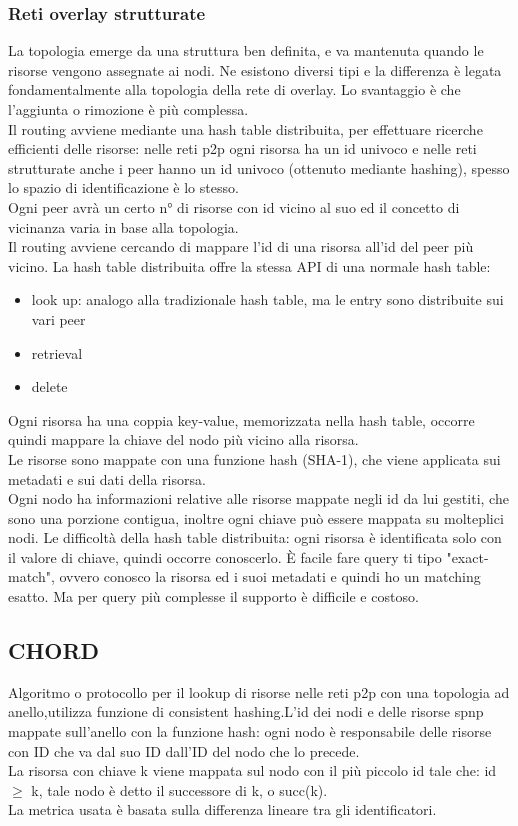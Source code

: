\documentclass{article}
\begin{document}
\subsubsection{Reti overlay strutturate}
La topologia emerge da una struttura ben definita, e va mantenuta quando le risorse vengono assegnate ai nodi. Ne esistono diversi tipi e la differenza è legata fondamentalmente alla topologia della rete di overlay. Lo svantaggio è che l'aggiunta o rimozione è più complessa.\\ Il routing avviene mediante una hash table distribuita, per effettuare ricerche efficienti delle risorse: nelle reti p2p ogni risorsa ha un id univoco e nelle reti strutturate anche i peer hanno un id univoco (ottenuto mediante hashing), spesso lo spazio di identificazione è lo stesso.\\ Ogni peer avrà un certo n° di risorse con id vicino al suo ed il concetto di vicinanza varia in base alla topologia.\\ Il routing avviene cercando di mappare l'id di una risorsa all'id del peer più vicino. La hash table distribuita offre la stessa API di una normale hash table:
\begin{itemize}
\item look up: analogo alla tradizionale hash table, ma le entry sono distribuite sui vari peer
\item retrieval
\item delete
\end{itemize}
Ogni risorsa ha una coppia key-value, memorizzata nella hash table, occorre quindi mappare la chiave del nodo più vicino alla risorsa.\\ Le risorse sono mappate con una funzione hash (SHA-1), che viene applicata sui metadati e sui dati della risorsa.\\ Ogni nodo ha informazioni relative alle risorse mappate negli id da lui gestiti, che sono una porzione contigua, inoltre ogni chiave può essere mappata su molteplici nodi. Le difficoltà della hash table distribuita: ogni risorsa è identificata solo con il valore di chiave, quindi occorre conoscerlo. È facile fare query ti tipo "exact-match", ovvero conosco la risorsa ed i suoi metadati e quindi ho un matching esatto. Ma per query più complesse il supporto è difficile e costoso.
\subsection{CHORD}
Algoritmo o protocollo per il lookup di risorse nelle reti p2p con una topologia ad anello,utilizza funzione di consistent hashing.L'id dei nodi e delle risorse spnp mappate sull'anello con la funzione hash: ogni nodo è responsabile delle risorse con ID che va dal suo ID dall'ID del nodo che lo precede.\\ La risorsa con chiave k viene mappata sul nodo con il più piccolo id tale che: id $\geq$ k, tale nodo è detto il successore di k, o succ(k).\\ La metrica usata è basata sulla differenza lineare tra gli identificatori.
\end{document}
